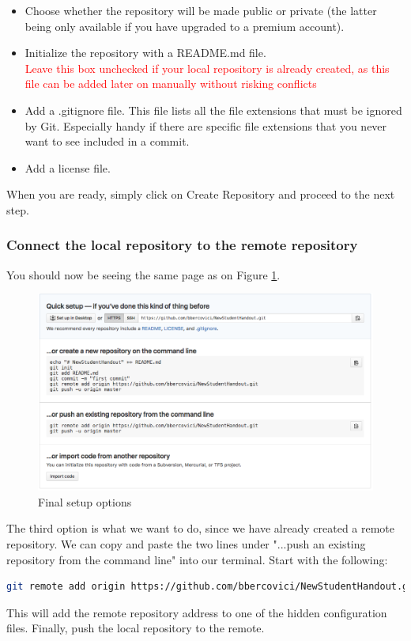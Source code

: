 \documentclass{report}
\begin{document}
\begin{itemize}
\item Choose whether the repository will be made public or private (the latter being only available if you have upgraded to a premium account).
\item Initialize the repository with a README.md file. \\\textcolor{red}{Leave this box unchecked if your local repository is already created, as this file can be added later on manually without risking conflicts}
\item Add a .gitignore file. This file lists all the file extensions that must be ignored by Git. Especially handy if there are specific file extensions that you never want to see included in a commit.
\item Add a license file.
\end{itemize}
When you are ready, simply click on Create Repository and proceed to the next step.
\subsubsection{Connect the local repository to the remote repository}
You should now be seeing the same page as on Figure \ref{fig:setup_options}. 

\begin{figure}[H]
\centering
\includegraphics[scale=0.4]{setup_options}
\caption{Final setup options}
\label{fig:setup_options}
\end{figure}
The third option is what we want to do, since we have already created a remote repository. We can copy and paste the two lines under "...push an existing repository from the command line" into our terminal. Start with the following:
\begin{lstlisting}[language=bash, caption=Add the remote repository location ]
git remote add origin https://github.com/bbercovici/NewStudentHandout.git
\end{lstlisting}
This will add the remote repository address to one of the hidden configuration files. Finally, push the local repository to the remote.
\end{document}
